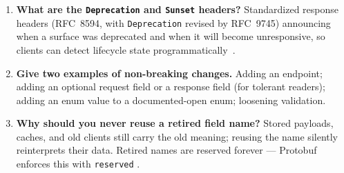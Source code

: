 \begin{enumerate}[label=\textbf{Q\arabic*.}, leftmargin=1.6cm]
        Deprecated means still functional but discouraged, no longer
        enhanced, and scheduled for removal; retired (sunset) means the
        surface no longer responds (typically 410 Gone or a redirect).
  \item \textbf{What are the \texttt{Deprecation} and \texttt{Sunset}
        headers?}
        Standardized response headers (RFC~8594, with \texttt{Deprecation}
        revised by RFC~9745) announcing when a surface was deprecated and
        when it will become unresponsive, so clients can detect lifecycle
        state programmatically~\cite{rfc8594}.
  \item \textbf{Give two examples of non-breaking changes.}
        Adding an endpoint; adding an optional request field or a response
        field (for tolerant readers); adding an enum value to a
        documented-open enum; loosening validation.
  \item \textbf{Why should you never reuse a retired field name?}
        Stored payloads, caches, and old clients still carry the old meaning;
        reusing the name silently reinterprets their data. Retired names are
        reserved forever --- Protobuf enforces this with \texttt{reserved}
        \cite{protobufdocs}.
\end{enumerate}

